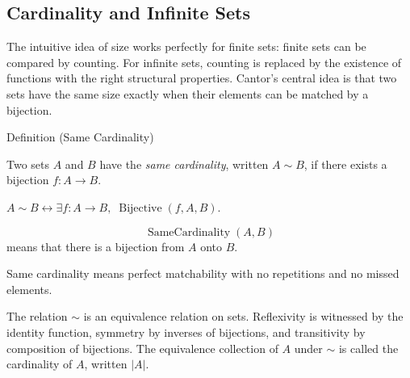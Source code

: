 
\subsection{Cardinality and Infinite Sets}

\begin{exposition}
The intuitive idea of size works perfectly for finite sets: finite sets can be
compared by counting. For infinite sets, counting is replaced by the existence
of functions with the right structural properties. Cantor's central idea is
that two sets have the same size exactly when their elements can be matched by
a bijection.
\end{exposition}


\begin{definitionbox}{Definition (Same Cardinality)}
\begin{definition}\label{def:same-cardinality}
Two sets $A$ and $B$ have the \emph{same cardinality}, written $A \sim B$,
if there exists a bijection $f : A \to B$.
\end{definition}
\end{definitionbox}

\begin{remark*}
$A\sim B \leftrightarrow \exists f:A\to B,\;
\operatorname{Bijective}(f,A,B)$.
\end{remark*}

\begin{remark*}
\[
  \operatorname{SameCardinality}(A,B)
\] means that there is a bijection from
$A$ onto $B$.
\end{remark*}

\begin{remark*}[Interpretation]
Same cardinality means perfect matchability with no repetitions and no missed
elements.
\end{remark*}

\begin{remark*}[Exposition]
The relation $\sim$ is an equivalence relation on sets. Reflexivity is
witnessed by the identity function, symmetry by inverses of bijections, and
transitivity by composition of bijections. The equivalence collection of $A$ under
$\sim$ is called the cardinality of $A$, written $|A|$.
\end{remark*}

